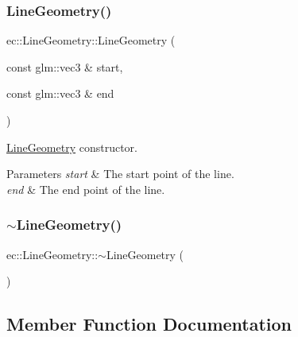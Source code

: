 \subsubsection{\texorpdfstring{Line\+Geometry()}{LineGeometry()}}
{\footnotesize\ttfamily ec\+::\+Line\+Geometry\+::\+Line\+Geometry (\begin{DoxyParamCaption}\item[{const glm\+::vec3 \&}]{start,  }\item[{const glm\+::vec3 \&}]{end }\end{DoxyParamCaption})\hspace{0.3cm}{\ttfamily [explicit]}}



\mbox{\hyperlink{classec_1_1_line_geometry}{Line\+Geometry}} constructor. 


\begin{DoxyParams}{Parameters}
{\em start} & The start point of the line. \\
\hline
{\em end} & The end point of the line. \\
\hline
\end{DoxyParams}
\mbox{\label{classec_1_1_line_geometry_af91430db7913243304adba2dd398e5b4}} 
\subsubsection{\texorpdfstring{$\sim$\+Line\+Geometry()}{~LineGeometry()}}
{\footnotesize\ttfamily ec\+::\+Line\+Geometry\+::$\sim$\+Line\+Geometry (\begin{DoxyParamCaption}{ }\end{DoxyParamCaption})\hspace{0.3cm}{\ttfamily [default]}}



\subsection{Member Function Documentation}
\mbox{\label{classec_1_1_line_geometry_a3f4616c581e43529651008c594c4c8f7}} 
